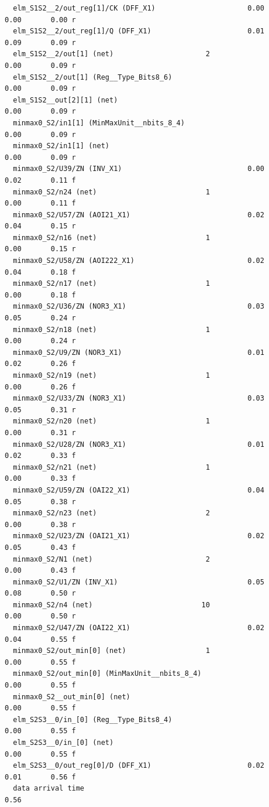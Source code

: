 \documentclass[a4paper,12pt,twoside]{article}
\begin{document}
\begin{verbatim}
  elm_S1S2__2/out_reg[1]/CK (DFF_X1)                      0.00      0.00       0.00 r
  elm_S1S2__2/out_reg[1]/Q (DFF_X1)                       0.01      0.09       0.09 r
  elm_S1S2__2/out[1] (net)                      2                   0.00       0.09 r
  elm_S1S2__2/out[1] (Reg__Type_Bits8_6)                            0.00       0.09 r
  elm_S1S2__out[2][1] (net)                                         0.00       0.09 r
  minmax0_S2/in1[1] (MinMaxUnit__nbits_8_4)                         0.00       0.09 r
  minmax0_S2/in1[1] (net)                                           0.00       0.09 r
  minmax0_S2/U39/ZN (INV_X1)                              0.00      0.02       0.11 f
  minmax0_S2/n24 (net)                          1                   0.00       0.11 f
  minmax0_S2/U57/ZN (AOI21_X1)                            0.02      0.04       0.15 r
  minmax0_S2/n16 (net)                          1                   0.00       0.15 r
  minmax0_S2/U58/ZN (AOI222_X1)                           0.02      0.04       0.18 f
  minmax0_S2/n17 (net)                          1                   0.00       0.18 f
  minmax0_S2/U36/ZN (NOR3_X1)                             0.03      0.05       0.24 r
  minmax0_S2/n18 (net)                          1                   0.00       0.24 r
  minmax0_S2/U9/ZN (NOR3_X1)                              0.01      0.02       0.26 f
  minmax0_S2/n19 (net)                          1                   0.00       0.26 f
  minmax0_S2/U33/ZN (NOR3_X1)                             0.03      0.05       0.31 r
  minmax0_S2/n20 (net)                          1                   0.00       0.31 r
  minmax0_S2/U28/ZN (NOR3_X1)                             0.01      0.02       0.33 f
  minmax0_S2/n21 (net)                          1                   0.00       0.33 f
  minmax0_S2/U59/ZN (OAI22_X1)                            0.04      0.05       0.38 r
  minmax0_S2/n23 (net)                          2                   0.00       0.38 r
  minmax0_S2/U23/ZN (OAI21_X1)                            0.02      0.05       0.43 f
  minmax0_S2/N1 (net)                           2                   0.00       0.43 f
  minmax0_S2/U1/ZN (INV_X1)                               0.05      0.08       0.50 r
  minmax0_S2/n4 (net)                          10                   0.00       0.50 r
  minmax0_S2/U47/ZN (OAI22_X1)                            0.02      0.04       0.55 f
  minmax0_S2/out_min[0] (net)                   1                   0.00       0.55 f
  minmax0_S2/out_min[0] (MinMaxUnit__nbits_8_4)                     0.00       0.55 f
  minmax0_S2__out_min[0] (net)                                      0.00       0.55 f
  elm_S2S3__0/in_[0] (Reg__Type_Bits8_4)                            0.00       0.55 f
  elm_S2S3__0/in_[0] (net)                                          0.00       0.55 f
  elm_S2S3__0/out_reg[0]/D (DFF_X1)                       0.02      0.01       0.56 f
  data arrival time                                                            0.56


\end{verbatim}
\end{document}
